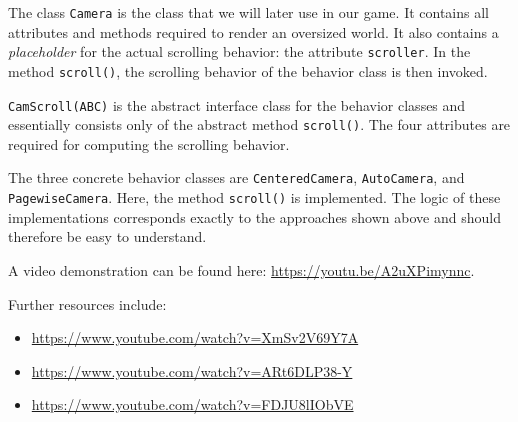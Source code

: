 The class \texttt{Camera} is the class that we will later use in our game. It contains all attributes and methods required to render an oversized world. It also contains a \emph{placeholder} for the actual scrolling behavior: the attribute \texttt{scroller}. In the method \texttt{scroll()}, the scrolling behavior of the behavior class is then invoked.



\texttt{CamScroll(ABC)} is the abstract interface class for the behavior classes and essentially consists only of the abstract method \texttt{scroll()}. The four attributes are required for computing the scrolling behavior.


The three concrete behavior classes are \texttt{CenteredCamera}, \texttt{AutoCamera}, and \texttt{Page\-wise\-Camera}. Here, the method \texttt{scroll()} is implemented. The logic of these implementations corresponds exactly to the approaches shown above and should therefore be easy to understand.

%


A video demonstration can be found here: \href{https://youtu.be/A2uXPimynnc}{https://youtu.be/A2uXPimynnc}.  

Further resources include:
\begin{itemize}
	\item \href{https://www.youtube.com/watch?v=XmSv2V69Y7A}{https://www.youtube.com/watch?v=XmSv2V69Y7A}
	\item \href{https://www.youtube.com/watch?v=ARt6DLP38-Y}{https://www.youtube.com/watch?v=ARt6DLP38-Y}
	\item \href{https://www.youtube.com/watch?v=FDJU8lIObVE}{https://www.youtube.com/watch?v=FDJU8lIObVE}
\end{itemize}

